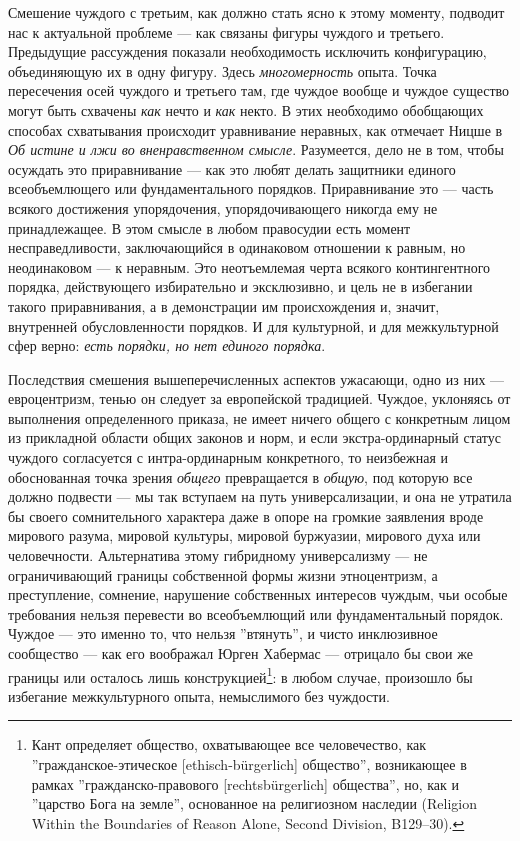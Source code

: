\documentclass[12pt]{book}
\begin{document}
Смешение чуждого с третьим, как должно стать ясно к этому моменту, подводит нас к актуальной проблеме --- как связаны фигуры чуждого и третьего. Предыдущие рассуждения показали необходимость исключить конфигурацию, объединяющую их в одну фигуру. Здесь \textit{многомерность} опыта. Точка пересечения осей чуждого и третьего там, где чуждое вообще и чуждое существо могут быть схвачены \textit{как} нечто и \textit{как} некто. В этих необходимо обобщающих способах схватывания происходит уравнивание неравных, как отмечает Ницше в \textit{Об истине и лжи во вненравственном смысле}. Разумеется, дело не в том, чтобы осуждать это приравнивание --- как это любят делать защитники единого всеобъемлющего или фундаментального порядков. Приравнивание это --- часть всякого достижения упорядочения, упорядочивающего никогда ему не принадлежащее. В этом смысле в любом правосудии есть момент несправедливости, заключающийся в одинаковом отношении к равным, но неодинаковом --- к неравным. Это неотъемлемая черта всякого контингентного порядка, действующего избирательно и эксклюзивно, и цель не в избегании такого приравнивания, а в демонстрации им происхождения и, значит, внутренней обусловленности порядков. И для культурной, и для межкультурной сфер верно: \textit{есть порядки, но нет единого порядка}.

Последствия смешения вышеперечисленных аспектов ужасающи, одно из них --- евроцентризм, тенью он следует за европейской традицией. Чуждое, уклоняясь от выполнения определенного приказа, не имеет ничего общего с конкретным лицом из прикладной области общих законов и норм, и если экстра-ординарный статус чуждого согласуется с интра-ординарным конкретного, то неизбежная и обоснованная точка зрения \textit{общего} превращается в \textit{общую}, под которую все должно подвести --- мы так вступаем на путь универсализации, и она не утратила бы своего сомнительного характера даже в опоре на громкие заявления вроде мирового разума, мировой культуры, мировой буржуазии, мирового духа или человечности. Альтернатива этому гибридному универсализму --- не ограничивающий границы собственной формы жизни этноцентризм, а преступление, сомнение, нарушение собственных интересов чуждым, чьи особые требования нельзя перевести во всеобъемлющий или фундаментальный порядок. Чуждое --- это именно то, что нельзя ''втянуть'', и чисто инклюзивное сообщество --- как его воображал Юрген Хабермас --- отрицало бы свои же границы или осталось лишь конструкцией\footnote{Кант определяет общество, охватывающее все человечество, как ''гражданское-этическое [ethisch-bürgerlich] общество'', возникающее в рамках ''гражданско-правового [rechtsbürgerlich] общества'', но, как и ''царство Бога на земле'', основанное на религиозном наследии (Religion Within the Boundaries of Reason Alone, Second Division, B129–30).}: в любом случае, произошло бы избегание межкультурного опыта, немыслимого без чуждости.
\end{document}
